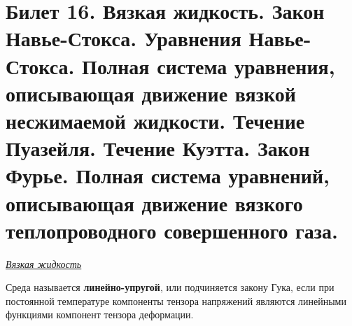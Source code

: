 \newpage
\section{Билет 16. Вязкая жидкость. Закон Навье-Стокса. Уравнения Навье-Стокса. Полная система уравнения, описывающая движение вязкой несжимаемой жидкости. Течение Пуазейля. Течение Куэтта. Закон Фурье. Полная система уравнений, описывающая движение вязкого теплопроводного совершенного газа.}

\begin{center}
	\textit{\underline{Вязкая жидкость}}
\end{center}
\quad[Э-137]Среда называется \textbf{линейно-упругой}, или подчиняется закону Гука, если при постоянной температуре компоненты тензора напряжений являются линейными функциями компонент тензора деформации.